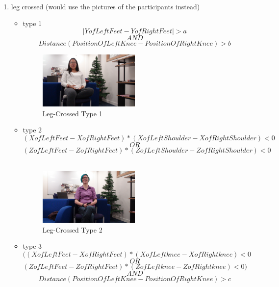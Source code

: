 \begin{enumerate}
  \item leg crossed (would use the pictures of the participants instead)
  \begin{itemize}
    \item type 1 \hfill \\
    \[| Y of Left Feet - Y of Right Feet | > a\]
    \[AND\]
    \[ Distance( PositionOf Left Knee - PositionOf Right Knee) > b\]

    \begin{figure}[h]
    \centering
      \includegraphics[width=0.5\textwidth]{figs/c1}
    \caption{Leg-Crossed Type 1}
    \end{figure}

    \item type 2 \hfill \\
    \[ ( X of Left Feet - X of Right Feet)* (X of Left Shoulder - X of Right Shoulder) < 0\]
    \[ OR\]
    \[ ( Z of Left Feet - Z of Right Feet)* (Z of Left Shoulder - Z of Right Shoulder) < 0\]\\

    \begin{figure}[h]
    \centering
      \includegraphics[width=0.5\textwidth]{figs/c2}
    \caption{Leg-Crossed Type 2}
    \end{figure}

    \item type 3 \hfill \\
    \[( ( X of Left Feet - X of Right Feet)* (X of Left knee - X of Right knee) < 0\]
    \[OR\]
    \[ ( Z of Left Feet - Z of Right Feet)* (Z of Left knee - Z of Right knee) < 0)\]
    \[AND\]
    \[ Distance(PositionOf Left Knee - PositionOf Right Knee)> c\]


\end{itemize}
\end{enumerate}
